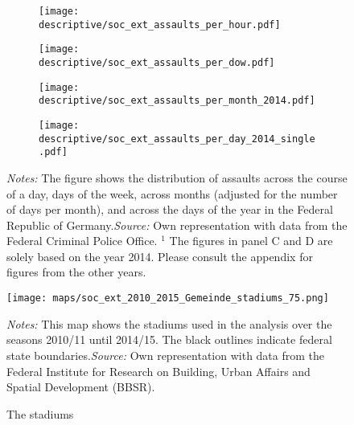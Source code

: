 \documentclass[11pt, a4paper]{article} %
\begin{document}
\vspace*{\fill}
\begin{figure}[H]\centering
	\caption{Distribution of assaults across time}\label{fig_soc_ext:assault_time_distribution_2014}
	\begin{subfigure}[h]{0.48\linewidth}\centering
		\texttt{[image: descriptive/soc\_ext\_assaults\_per\_hour.pdf]}
	\end{subfigure}
	\begin{subfigure}[h]{0.48\linewidth}\centering
		\texttt{[image: descriptive/soc\_ext\_assaults\_per\_dow.pdf]}
	\end{subfigure}

	\begin{subfigure}[h]{0.48\linewidth}\centering
		\texttt{[image: descriptive/soc\_ext\_assaults\_per\_month\_2014.pdf]}
	\end{subfigure}
	\begin{subfigure}[h]{0.48\linewidth}\centering
		\texttt{[image: descriptive/soc\_ext\_assaults\_per\_day\_2014\_single.pdf]}
	\end{subfigure}
	\begin{minipage}{\linewidth}
		\scriptsize{\emph{Notes:} The figure shows the distribution of assaults across the course of a day, days of the week, across months (adjusted for the number of days per month), and across the days of the year in the Federal Republic of Germany.\newline \emph{Source:} Own representation with data from the Federal Criminal Police Office.\newline \hspace{1 em} $^1$ The figures in panel C and D are solely based on the year 2014. Please consult the appendix for figures from the other years.}
	\end{minipage}
\end{figure}
\vspace*{\fill}\clearpage



\vspace*{\fill}
\begin{figure}[H]\centering
	\caption{The stadiums}\label{fig_soc_ext:map_gem_stadiums}
	\texttt{[image: maps/soc\_ext\_2010\_2015\_Gemeinde\_stadiums\_75.png]}
	\begin{minipage}{0.95\linewidth}
		\scriptsize{\emph{Notes:} This map shows the stadiums used in the analysis over the seasons 2010/11 until 2014/15. The black outlines indicate federal state boundaries.\newline \emph{Source:} Own representation with data from the Federal Institute for Research on Building, Urban Affairs and Spatial Development (BBSR).}
	\end{minipage}
\end{figure}
\vspace*{\fill}\clearpage
\end{document}
